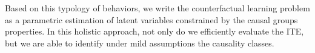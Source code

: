 Based on this typology of behaviors, we write the counterfactual learning problem as a parametric estimation of latent variables constrained by the causal groups properties. In this holistic approach, not only do we efficiently evaluate the ITE, but we are able to identify under mild assumptions the causality classes.









